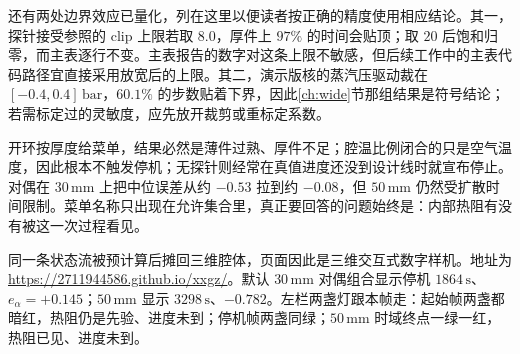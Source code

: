 还有两处边界效应已量化，列在这里以便读者按正确的精度使用相应结论。其一，探针接受参照的 \(\mathrm{clip}\) 上限若取 \(8.0\)，厚件上 \(97\%\) 的时间会贴顶；取 \(20\) 后饱和归零，而主表逐行不变。主表报告的数字对这条上限不敏感，但后续工作中的主表代码路径宜直接采用放宽后的上限。其二，演示版核的蒸汽压驱动裁在 \([-0.4,0.4]\,\mathrm{bar}\)，\(60.1\%\) 的步数贴着下界，因此\ref{ch:wide}{}节那组结果是符号结论；若需标定过的灵敏度，应先放开裁剪或重标定系数。

开环按厚度给菜单，结果必然是薄件过熟、厚件不足；腔温比例闭合的只是空气温度，因此根本不触发停机；无探针则经常在真值进度还没到设计线时就宣布停止。对偶在 \(30\,\mathrm{mm}\) 上把中位误差从约 \(-0.53\) 拉到约 \(-0.08\)，但 \(50\,\mathrm{mm}\) 仍然受扩散时间限制。菜单名称只出现在允许集合里，真正要回答的问题始终是：内部热阻有没有被这一次过程看见。

同一条状态流被预计算后摊回三维腔体，页面因此是三维交互式数字样机。地址为 \url{https://2711944586.github.io/xxgz/}。默认 \(30\,\mathrm{mm}\) 对偶组合显示停机 \(1864\,\mathrm{s}\)、\(e_{\alpha}=+0.145\)；\(50\,\mathrm{mm}\) 显示 \(3298\,\mathrm{s}\)、\(-0.782\)。左栏两盏灯跟本帧走：起始帧两盏都暗红，热阻仍是先验、进度未到；停机帧两盏同绿；\(50\,\mathrm{mm}\) 时域终点一绿一红，热阻已见、进度未到。

